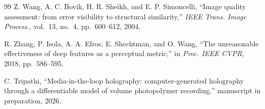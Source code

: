 \documentclass[conference]{IEEEtran}
\begin{document}
\begin{thebibliography}{99}
Z. Wang, A. C. Bovik, H. R. Sheikh, and E. P. Simoncelli, ``Image quality
assessment: from error visibility to structural similarity,''
\textit{IEEE Trans. Image Process.}, vol.~13, no.~4, pp.~600--612, 2004.

R. Zhang, P. Isola, A. A. Efros, E. Shechtman, and O. Wang, ``The unreasonable
effectiveness of deep features as a perceptual metric,'' in
\textit{Proc. IEEE CVPR}, 2018, pp.~586--595.

C. Tripathi, ``Media-in-the-loop holography: computer-generated holography
through a differentiable model of volume photopolymer recording,'' manuscript
in preparation, 2026.

\end{thebibliography}
\end{document}

